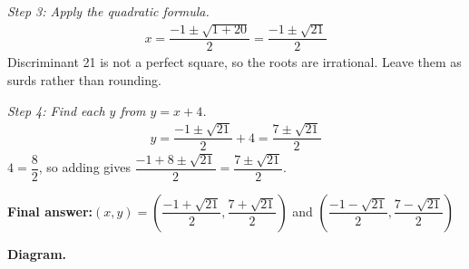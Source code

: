 \documentclass[11pt]{article}
\begin{document}
\textit{Step 3: Apply the quadratic formula.}
\[\begin{gathered}
x = \dfrac{-1 \pm \sqrt{1 + 20}}{2} = \dfrac{-1 \pm \sqrt{21}}{2}
\end{gathered}\]
Discriminant 21 is not a perfect square, so the roots are irrational. Leave them as surds rather than rounding.

\textit{Step 4: Find each \( y \) from \( y = x + 4 \).}
\[\begin{gathered}
y = \dfrac{-1 \pm \sqrt{21}}{2} + 4 = \dfrac{7 \pm \sqrt{21}}{2}
\end{gathered}\]
\( 4 = \dfrac{8}{2} \), so adding gives \( \dfrac{-1 + 8 \pm \sqrt{21}}{2} = \dfrac{7 \pm \sqrt{21}}{2} \).

\begin{answerbox}
\textbf{Final answer:}\quad \(\displaystyle (x, y) = \left(\dfrac{-1 + \sqrt{21}}{2}, \dfrac{7 + \sqrt{21}}{2}\right)\) and \(\displaystyle \left(\dfrac{-1 - \sqrt{21}}{2}, \dfrac{7 - \sqrt{21}}{2}\right)\)
\end{answerbox}
\textbf{Diagram.}
\end{document}
